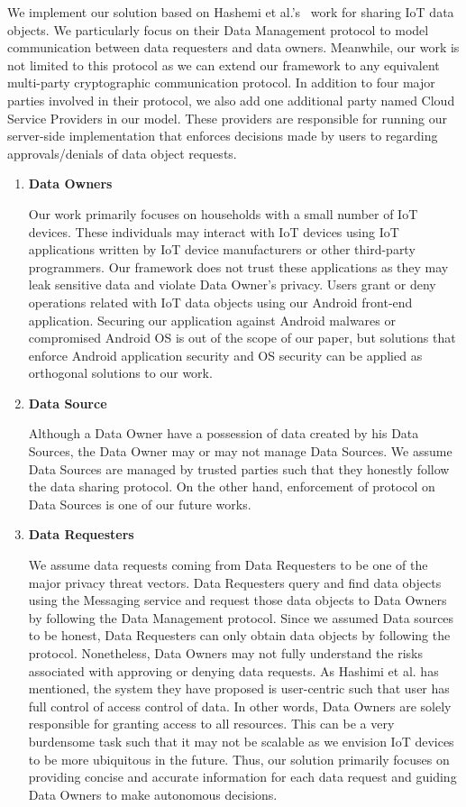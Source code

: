 We implement our solution based on Hashemi et al.'s~\cite{campbell} work for sharing IoT data objects. We particularly focus on their Data Management protocol to model communication between data requesters and data owners. Meanwhile, our work is not limited to this protocol as we can extend our framework to any equivalent multi-party cryptographic communication protocol. In addition to four major parties involved in their protocol, we also add one additional party named Cloud Service Providers in our model. These providers are responsible for running our server-side implementation that enforces decisions made by users to regarding approvals/denials of data object requests. 

\begin{enumerate}
\item \textbf {Data Owners} 

Our work primarily focuses on households with a small number of IoT devices. These individuals may interact with IoT devices using IoT applications written by IoT device manufacturers or other third-party programmers. Our framework does not trust these applications as they may leak sensitive data and violate Data Owner's privacy. Users grant or deny operations related with IoT data objects using our Android front-end  application. Securing our application against Android malwares or compromised Android OS is out of the scope of our paper, but solutions that enforce Android application security and OS security \cite{tz} can be applied as orthogonal solutions to our work. 

\item \textbf{Data Source} 

Although a Data Owner have a possession of data created by his Data Sources, the Data Owner may or may not manage Data Sources. We assume Data Sources are managed by trusted parties such that they honestly follow the data sharing protocol. On the other hand, enforcement of protocol on Data Sources is one of our future works. 

\item \textbf {Data Requesters}

We assume data requests coming from Data Requesters to be one of the major privacy threat vectors. Data Requesters query and find data objects using the Messaging service and request those data objects to Data Owners by following the Data Management protocol. Since we assumed Data sources to be honest, Data Requesters can only obtain data objects by following the protocol. Nonetheless, Data Owners may not fully understand the risks associated with approving or denying data requests. As Hashimi et al. has mentioned, the system they have proposed is user-centric such that user has full control of access control of data. In other words, Data Owners are solely responsible for granting access to all resources. This can be a very burdensome task such that it may not be scalable as we envision IoT devices to be more ubiquitous in the future. Thus, our solution primarily focuses on providing concise and accurate information for each data request and guiding Data Owners to make autonomous decisions.


\end{enumerate}
